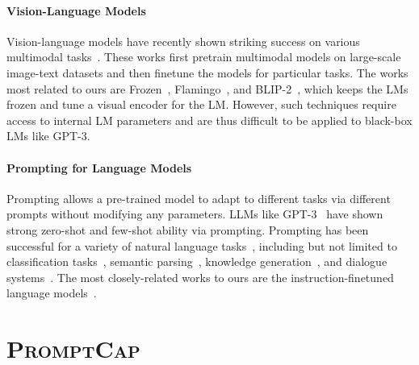 \documentclass[10pt,twocolumn,letterpaper]{article}
\newcommand{\NAME}{\textsc{PromptCap}\xspace}
\begin{document}
\vspace{-0.1in}
\paragraph{Vision-Language Models}
Vision-language models have recently shown striking success on various multimodal tasks~\cite{su2019vl,lu2019vilbert,chen2019uniter,li2020oscar,wang2021simvlm,kim2021vilt, radford2021learning,yang2022unitab,wang2022git,wang2022ofa, Lu2022UnifiedIOAU,yuan2021florence,chen2022pali, Li2023BLIP2BL}. These works first pretrain multimodal models on large-scale image-text datasets and then finetune the models for particular tasks. The works most related to ours are Frozen~\cite{tsimpoukelli2021multimodal}, Flamingo~\cite{alayrac2022flamingo}, and BLIP-2~\cite{Li2023BLIP2BL}, which keeps the LMs frozen and tune a visual encoder for the LM. However, such techniques require access to internal LM parameters and are thus difficult to be applied to black-box LMs like GPT-3. 

\vspace{-0.1in}
\paragraph{Prompting for Language Models}
Prompting allows a pre-trained model to adapt to different tasks via different prompts without modifying any parameters. LLMs like GPT-3~\cite{brown2020language} have shown strong zero-shot and few-shot ability via prompting.
Prompting has been successful for a variety of natural language tasks~\cite{liu2021pre}, including but not limited to  classification tasks~\cite{min2022metaicl, shi2022nearest}, semantic parsing~\cite{xie2022unifiedskg}, knowledge generation~\cite{Shi2023REPLUGRB, liu2022generated}, and dialogue systems~\cite{lee2021dialogue, hu-etal-2022-context}.
The most closely-related works to ours are the instruction-finetuned language models~\cite{t0,wei2021finetuned, Wang2022SuperNaturalInstructionsGV}.





 



\section{\NAME}
\label{sec:promptcap}
\end{document}
